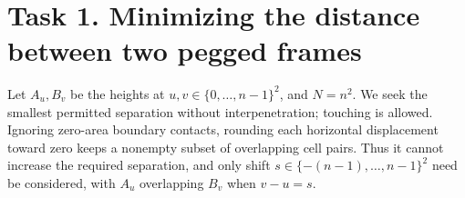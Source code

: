 \documentclass[11pt]{article}
\begin{document}
{\Large
\begin{center}

{}~\\
\vspace{0.25cm}
\end{center}
}



\newpage
\section*{Task 1. Minimizing the distance between two pegged frames}

Let $A_u,B_v$ be the heights at $u,v\in\{0,\ldots,n-1\}^2$, and $N=n^2$.
We seek the smallest permitted separation without interpenetration;
touching is allowed. Ignoring zero-area boundary contacts, rounding each
horizontal displacement toward zero keeps a nonempty subset of overlapping
cell pairs. Thus it cannot increase the required separation, and only
shift $s\in\{-(n-1),\ldots,n-1\}^2$ need be considered, with $A_u$ overlapping
$B_v$ when $v-u=s$.
\end{document}
